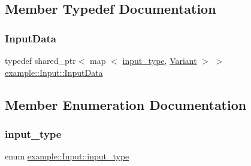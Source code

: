 \subsection{Member Typedef Documentation}
\mbox{\label{classexample_1_1_input_af6bf4fd763ca01bd106ca3b03f162e3d}} 
\subsubsection{\texorpdfstring{Input\+Data}{InputData}}
{\footnotesize\ttfamily typedef shared\+\_\+ptr$<$ map $<$ \mbox{\hyperlink{classexample_1_1_input_a315efe66cfd6b49cbe0f46ab46ece59f}{input\+\_\+type}}, \mbox{\hyperlink{classexample_1_1_variant}{Variant}} $>$ $>$ \mbox{\hyperlink{classexample_1_1_input_af6bf4fd763ca01bd106ca3b03f162e3d}{example\+::\+Input\+::\+Input\+Data}}}



\subsection{Member Enumeration Documentation}
\mbox{\label{classexample_1_1_input_a315efe66cfd6b49cbe0f46ab46ece59f}} 
\subsubsection{\texorpdfstring{input\+\_\+type}{input\_type}}
{\footnotesize\ttfamily enum \mbox{\hyperlink{classexample_1_1_input_a315efe66cfd6b49cbe0f46ab46ece59f}{example\+::\+Input\+::input\+\_\+type}}}

